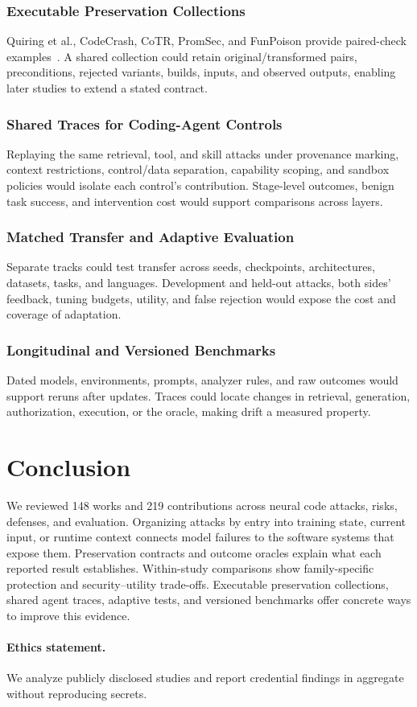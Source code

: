 \documentclass[acmsmall,screen,review,nonacm]{acmart}
\begin{document}
\subsubsection{Executable Preservation Collections}
Quiring et al., CodeCrash, CoTR, PromSec, and FunPoison provide paired-check examples~\cite{quiring2019authorship,codecrash2025,yang2025cotr,promsec2024,xiao2026funpoison}. A shared collection could retain original/transformed pairs, preconditions, rejected variants, builds, inputs, and observed outputs, enabling later studies to extend a stated contract.

\subsubsection{Shared Traces for Coding-Agent Controls}
Replaying the same retrieval, tool, and skill attacks under provenance marking, context restrictions, control/data separation, capability scoping, and sandbox policies would isolate each control's contribution. Stage-level outcomes, benign task success, and intervention cost would support comparisons across layers.

\subsubsection{Matched Transfer and Adaptive Evaluation}
Separate tracks could test transfer across seeds, checkpoints, architectures, datasets, tasks, and languages. Development and held-out attacks, both sides' feedback, tuning budgets, utility, and false rejection would expose the cost and coverage of adaptation.

\subsubsection{Longitudinal and Versioned Benchmarks}
Dated models, environments, prompts, analyzer rules, and raw outcomes would support reruns after updates. Traces could locate changes in retrieval, generation, authorization, execution, or the oracle, making drift a measured property.

\section{Conclusion}
\label{sec:conclusion}

We reviewed 148 works and 219 contributions across neural code attacks, risks, defenses, and evaluation. Organizing attacks by entry into training state, current input, or runtime context connects model failures to the software systems that expose them. Preservation contracts and outcome oracles explain what each reported result establishes. Within-study comparisons show family-specific protection and security--utility trade-offs. Executable preservation collections, shared agent traces, adaptive tests, and versioned benchmarks offer concrete ways to improve this evidence.

\paragraph*{Ethics statement.} We analyze publicly disclosed studies and report credential findings in aggregate without reproducing secrets.



\end{document}
